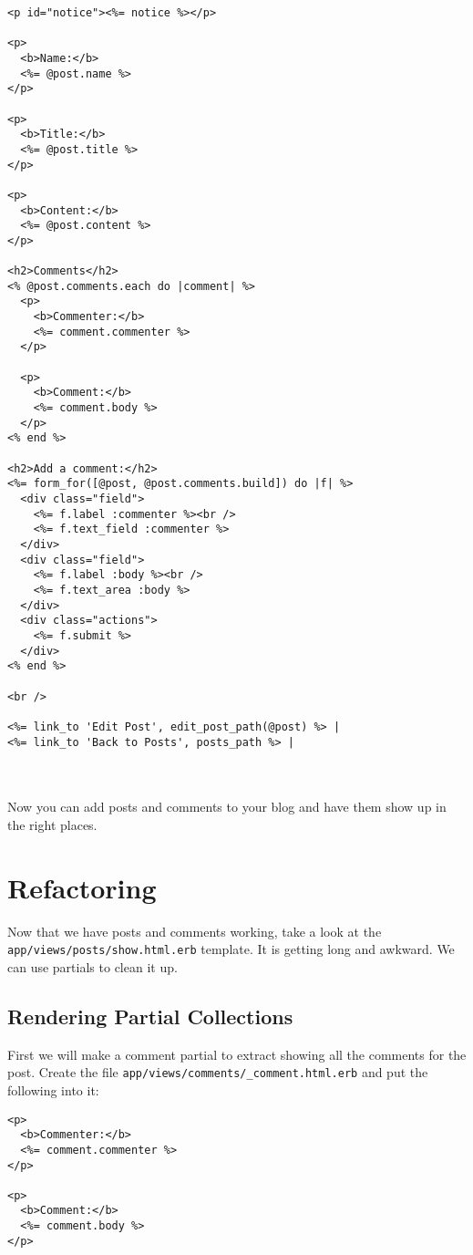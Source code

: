 \documentclass[10pt]{book}
\begin{document}
\begin{minipage}{\textwidth}
\begin{verbatim}
<p id="notice"><%= notice %></p>
 
<p>
  <b>Name:</b>
  <%= @post.name %>
</p>
 
<p>
  <b>Title:</b>
  <%= @post.title %>
</p>
 
<p>
  <b>Content:</b>
  <%= @post.content %>
</p>
 
<h2>Comments</h2>
<% @post.comments.each do |comment| %>
  <p>
    <b>Commenter:</b>
    <%= comment.commenter %>
  </p>
 
  <p>
    <b>Comment:</b>
    <%= comment.body %>
  </p>
<% end %>
 
<h2>Add a comment:</h2>
<%= form_for([@post, @post.comments.build]) do |f| %>
  <div class="field">
    <%= f.label :commenter %><br />
    <%= f.text_field :commenter %>
  </div>
  <div class="field">
    <%= f.label :body %><br />
    <%= f.text_area :body %>
  </div>
  <div class="actions">
    <%= f.submit %>
  </div>
<% end %>
 
<br />
 
<%= link_to 'Edit Post', edit_post_path(@post) %> |
<%= link_to 'Back to Posts', posts_path %> |
\end{verbatim}
\end{minipage}
\\ \\

Now you can add posts and comments to your blog and have them show up in the right places.

\section{ Refactoring}

Now that we have posts and comments working, take a look at the \texttt{app/views/posts/show.html.erb} template. It is getting long and awkward. We can use partials to clean it up.

\subsection{ Rendering Partial Collections}

First we will make a comment partial to extract showing all the comments for the post. Create the file \texttt{app/views/comments/\_comment.html.erb} and put the following into it:


\begin{verbatim}
<p>
  <b>Commenter:</b>
  <%= comment.commenter %>
</p>
 
<p>
  <b>Comment:</b>
  <%= comment.body %>
</p>
\end{verbatim}
\end{document}

